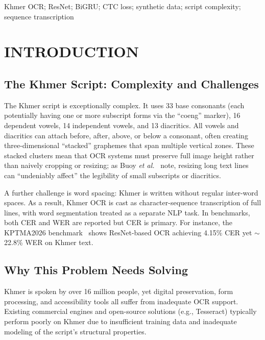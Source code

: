 \documentclass[conference]{IEEEtran}
\begin{document}
\begin{IEEEkeywords}
Khmer OCR; ResNet; BiGRU; CTC loss; synthetic data; script complexity; sequence transcription
\end{IEEEkeywords}

\section{INTRODUCTION}

\subsection{The Khmer Script: Complexity and Challenges}

The Khmer script is exceptionally complex. It uses 33 base consonants (each
potentially having one or more subscript forms via the ``coeng'' marker),
16 dependent vowels, 14 independent vowels, and 13 diacritics. All vowels and
diacritics can attach before, after, above, or below a consonant, often creating
three-dimensional ``stacked'' graphemes that span multiple vertical zones. These
stacked clusters mean that OCR systems must preserve full image height rather
than naively cropping or resizing; as Buoy \emph{et al.}~\cite{buoy2023} note,
resizing long text lines can ``undeniably affect'' the legibility of small
subscripts or diacritics.

A further challenge is word spacing: Khmer is written without regular
inter-word spaces. As a result, Khmer OCR is cast as character-sequence
transcription of full lines, with word segmentation treated as a separate NLP
task. In benchmarks, both CER and WER are reported but CER is primary. For
instance, the KPTMA2026 benchmark~\cite{vitou2026} shows ResNet-based OCR
achieving 4.15\% CER yet $\sim$22.8\% WER on Khmer text.

\subsection{Why This Problem Needs Solving}

Khmer is spoken by over 16 million people, yet digital preservation, form
processing, and accessibility tools all suffer from inadequate OCR support.
Existing commercial engines and open-source solutions (e.g., Tesseract)
typically perform poorly on Khmer due to insufficient training data and
inadequate modeling of the script's structural properties.
\end{document}
